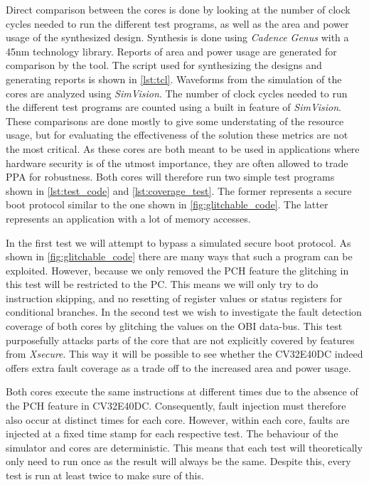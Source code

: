 Direct comparison between the cores is done by looking at the number of clock cycles needed to run the different test programs, as well as the area and power usage of the synthesized design. Synthesis is done using \textit{Cadence Genus} with a 45nm technology library. Reports of area and power usage are generated for comparison by the tool. The script used for synthesizing the designs and generating reports is shown in \autoref{lst:tcl}. Waveforms from the simulation of the cores are analyzed using \textit{SimVision}. The number of clock cycles needed to run the different test programs are counted using a built in feature of \textit{SimVision}. These comparisons are done mostly to give some understating of the resource usage, but for evaluating the effectiveness of the solution these metrics are not the most critical. As these cores are both meant to be used in applications where hardware security is of the utmost importance, they are often allowed to trade PPA for robustness. Both cores will therefore run two simple test programs shown in \autoref{lst:test_code} and \autoref{lst:coverage_test}. The former represents a secure boot protocol similar to the one shown in \autoref{fig:glitchable_code}. The latter represents an application with a lot of memory accesses. 

In the first test we will attempt to bypass a simulated secure boot protocol. As shown in \autoref{fig:glitchable_code} there are many ways that such a program can be exploited. However, because we only removed the PCH feature the glitching in this test will be restricted to the PC. This means we will only try to do instruction skipping, and no resetting of register values or status registers for conditional branches. In the second test we wish to investigate the fault detection coverage of both cores by glitching the values on the OBI data-bus. This test purposefully attacks parts of the core that are not explicitly covered by features from \textit{Xsecure}. This way it will be possible to see whether the CV32E40DC indeed offers extra fault coverage as a trade off to the increased area and power usage. 


Both cores execute the same instructions at different times due to the absence of the PCH feature in CV32E40DC. Consequently, fault injection must therefore also occur at distinct times for each core. However, within each core, faults are injected at a fixed time stamp for each respective test. The behaviour of the simulator and cores are deterministic. This means that each test will theoretically only need to run once as the result will always be the same. Despite this, every test is run at least twice to make sure of this.

